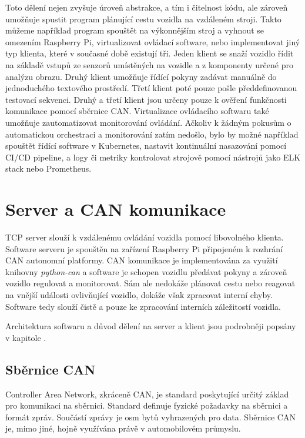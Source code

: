 \documentclass[czech, bachelor]{diploma}
\begin{document}
Toto dělení nejen zvyšuje úroveň abstrakce, a tím i čitelnost kódu, ale zároveň umožňuje spustit program plánující
cestu vozidla na vzdáleném stroji. Takto můžeme například program spouštět na výkonnějším stroj a vyhnout se omezením
Raspberry Pi, virtualizovat ovládací software, nebo implementovat jiný typ klienta, které v současné době existují tři.
Jeden klient se snaží vozidlo řídit na základě vstupů ze senzorů umístěných na vozidle a z komponenty určené pro analýzu obrazu.
Druhý klient umožňuje řídící pokyny zadávat manuálně do jednoduchého textového prostředí. Třetí klient poté pouze pošle
předdefinovanou testovací sekvenci. Druhý a třetí klient jsou určeny pouze k ověření funkčnosti komunikace pomocí sběrnice CAN.
Virtualizace ovládacího softwaru také umožňuje zautomatizovat monitorování ovládání. Ačkoliv k žádným pokusům o automatickou
orchestraci a monitorování zatím nedošlo, bylo by možné například spouštět řídící software v Kubernetes, nastavit kontinuální
nasazování pomocí CI/CD pipeline, a logy či metriky kontrolovat strojově pomocí nástrojů jako ELK stack nebo Prometheus.

\chapter{Server a CAN komunikace}

TCP server slouží k vzdálenému ovládání vozidla pomocí libovolného klienta. Software serveru je spouštěn na zařízení Raspberry Pi
připojeném k rozhrání CAN autonomní platformy. CAN komunikace je implementována za využití knihovny \emph{python-can} a software
je schopen vozidlu předávat pokyny a zároveň vozidlo regulovat a monitorovat. Sám ale nedokáže plánovat cestu nebo reagovat
na vnější události ovlivňující vozidlo, dokáže však zpracovat interní chyby. Software tedy slouží čistě a pouze ke zpracování
interních záležitostí vozidla.

Architektura softwaru a důvod dělení na server a klient jsou podrobněji popsány v kapitole .

\section{Sběrnice CAN}

Controller Area Network, zkráceně CAN, je standard poskytující určitý základ pro komunikaci na sběrnici. Standard definuje
fyzické požadavky na sběrnici a formát zpráv. Součástí zprávy je osm bytů vyhrazených pro data. Sběrnice CAN je, mimo jiné, hojně
využívána právě v automobilovém průmyslu.
\end{document}
